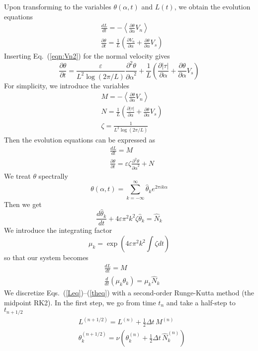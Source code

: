\documentclass[11pt]{article}
\newcommand{\ppd}[2]  { \frac{\partial^2 #1}{{\partial #2}^2} }
\newcommand{\abs}[1]{\left| #1 \right|}
\newcommand{\mean}[1]{\left< #1 \right>}
\newcommand{\eps}{\varepsilon}
\newcommand{\atau}{\abs{\tau}}
\newcommand{\pderiv}[2]{\frac{\partial #1}{\partial #2}}
\newcommand{\tderiv}[2]{\frac{d #1}{d #2}}
\newcommand{\Vn}{V_n}
\newcommand{\Vs}{V_s}
\newcommand{\thalpha}{\pderiv{\theta}{\alpha}}
\newcommand{\elfun}{\zeta}
\newcommand{\thhat}{\hat{\theta}}
\newcommand{\dt}{\Delta t}
\begin{document}
Upon transforming to the variables $\theta(\alpha,t)$ and $L(t)$, we obtain the evolution equations
\begin{align}
& \tderiv{L}{t} = - \mean{\thalpha \Vn} \\
& \pderiv{\theta}{t} = \frac{1}{L} \left( \pderiv{\Vn}{\alpha} + \thalpha \Vs \right)
\end{align}
Inserting Eq.~(\ref{eqn:Vn2}) for the normal velocity gives
\begin{equation}
\pderiv{\theta}{t} = \frac{\eps}{L^{2} \log \left(2\pi/L \right)} \ppd{\theta}{\alpha} 
+ \frac{1}{L} \left( \pderiv{\atau}{\alpha} + \thalpha \Vs \right)
\end{equation}
For simplicity, we introduce the variables
\begin{align}
& M = - \mean{\thalpha \Vn} \\
& N = \frac{1}{L} \left( \pderiv{\atau}{\alpha} + \thalpha \Vs \right) \\
& \elfun = \frac{1}{L^{2} \log \left(2\pi/L \right)}
\end{align}
Then the evolution equations can be expressed as
\begin{align}
& \tderiv{L}{t} = M \\
& \pderiv{\theta}{t} = \eps \elfun \ppd{\theta}{\alpha} + N
\end{align}
We treat $\theta$ spectrally
\begin{equation}
\theta(\alpha,t) = \sum_{k = -\infty}^{\infty} \thhat_k e^{2\pi i k \alpha}
\end{equation}
Then we get
\begin{equation}
\label{thODEs}
\tderiv{\thhat_k}{t} +  4 \eps \pi^2 k^2  \elfun \thhat_k = \hat{N}_k
\end{equation}
We introduce the integrating factor
\begin{equation}
\mu_k = \exp \left( 4 \eps \pi^2 k^2 \int \elfun dt \right)
\end{equation}
so that our system becomes
\begin{align}
\label{Leq}
& \tderiv{L}{t} = M \\
\label{theq}
& \tderiv{}{t}\left( \mu_k \theta_k \right) = \mu_k \hat{N}_k
\end{align}
We discretize Eqs.~(\ref{Leq})--(\ref{theq}) with a second-order Runge-Kutta method (the midpoint RK2). In the first step, we go from time $t_n$ and take a half-step to $t_{n+1/2}$
\begin{align}
& L^{(n+1/2)}  = L^{(n)} + \frac{1}{2}\dt \, M^{(n)} \\
& \theta_k^{(n+1/2)} = \nu \left( \theta_k^{(n)} + \frac{1}{2} \dt \,  \hat{N}_k^{(n)} \right)
\end{align}
\end{document}
